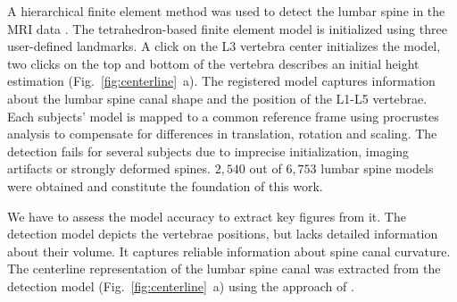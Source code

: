 \documentclass[a4paper,twoside]{style/article}
\newcommand{\com}[1]{\textcolor{orange}{\uline{#1}}}
\begin{document}
A hierarchical finite element method was used to detect the lumbar spine in the MRI data \cite{Rak2013}.
The tetrahedron-based finite element model is initialized using three user-defined landmarks.
A click on the L3 vertebra center initializes the model, two clicks on the top and bottom of the vertebra describes an initial height estimation (Fig.~\ref{fig:centerline}~a).
The registered model captures information about the lumbar spine canal shape and the position of the L1-L5 vertebrae.
Each subjects' model is mapped to a common reference frame using procrustes analysis to compensate for differences in translation, 
rotation and scaling.
The detection fails for several subjects due to imprecise initialization, imaging artifacts or strongly deformed spines.
$2,540$ out of $6,753$ lumbar spine models were obtained and constitute the foundation of this work.

We have to assess the model accuracy to extract key figures from it.
The detection model depicts the vertebrae positions, but lacks detailed information about their volume.
It captures reliable information about spine canal curvature.
The centerline representation of the lumbar spine canal was extracted from the detection model (Fig.~\ref{fig:centerline}~a) using the approach of \cite{Klemm2013VMV}.
\end{document}
